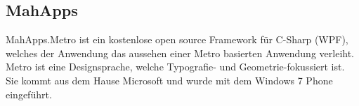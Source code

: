 \subsection{MahApps}
\label{mahapps}
MahApps.Metro ist ein kostenlose open source Framework für C-Sharp (WPF), welches der Anwendung das aussehen einer Metro basierten Anwendung verleiht. Metro ist eine Designsprache, welche Typografie- und Geometrie-fokussiert ist. Sie kommt aus dem Hause Microsoft und wurde mit dem Windows 7 Phone eingeführt.\cite{metro}
